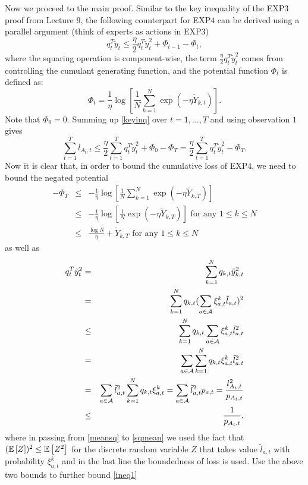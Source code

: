\documentclass[11pt]{article}
\begin{document}
Now we proceed to the main proof. Similar to the key inequality of the EXP$3$ proof from Lecture $9$, the following counterpart for EXP$4$ can be derived using a parallel argument (think of experts as actions in EXP$3$)
\begin{equation}\label{keyinq}
q_t^T\tilde{y}_t\leq \frac{\eta}{2}q_t^T\tilde{y}_t^2+\Phi_{t-1}-\Phi_t,
\end{equation}
where the squaring operation is component-wise, the term $\frac{\eta}{2}q_t^T\tilde{y}_t^2$ comes from controlling the cumulant generating function, and the potential function $\Phi_t$ is defined as:
\begin{equation*}
\Phi_t=\frac{1}{\eta}\log [\frac{1}{N}\sum_{k=1}^N\exp(-\eta\tilde{Y}_{k,t})].
\end{equation*}
Note that $\Phi_0=0$. Summing up \eqref{keyinq} over $t=1,\ldots,T$ and using observation $1$ gives
\begin{equation}\label{ineq1}
\sum_{t=1}^Tl_{A_t,t}\leq \frac{\eta}{2}\sum_{t=1}^Tq_t^T\tilde{y}_t^2+\Phi_0-\Phi_T=\frac{\eta}{2}\sum_{t=1}^Tq_t^T\tilde{y}_t^2-\Phi_T.
\end{equation}
Now it is clear that, in order to bound the cumulative loss of EXP$4$, we need to bound the negated potential
\begin{eqnarray*}
-\Phi_T&\leq&-\frac{1}{\eta}\log [\frac{1}{N}\sum_{k=1}^N\exp(-\eta\tilde{Y}_{k,T})]\\
&\leq&-\frac{1}{\eta}\log [\frac{1}{N}\exp(-\eta\tilde{Y}_{k,T})]\text{ for any }1\leq k\leq N\\
&\leq&\frac{\log N}{\eta}+\tilde{Y}_{k,T}\text{ for any }1\leq k\leq N
\end{eqnarray*}
as well as
\begin{eqnarray}
\nonumber q_t^T\tilde{y}_{t}^2&=&\sum_{k=1}^Nq_{k,t}\tilde{y}_{k,t}^2\\
&=&\sum_{k=1}^Nq_{k,t}(\sum_{a\in \mathcal{A}}\xi_{a,t}^k\tilde{l}_{a,t})^2 \label{meansq} \\
&\leq&\sum_{k=1}^Nq_{k,t}\sum_{a\in \mathcal{A}}\xi_{a,t}^k\tilde{l}_{a,t}^2 \label{sqmean} \\
\nonumber&=&\sum_{a\in \mathcal{A}}\sum_{k=1}^Nq_{k,t}\xi_{a,t}^k\tilde{l}_{a,t}^2\\
\nonumber&=&\sum_{a\in \mathcal{A}}\tilde{l}_{a,t}^2\sum_{k=1}^Nq_{k,t}\xi_{a,t}^k=\sum_{a\in \mathcal{A}}\tilde{l}_{a,t}^2p_{a,t}=\frac{l_{A_t,t}^2}{p_{A_t,t}}\\
\nonumber&\leq&\frac{1}{p_{A_t,t}},
\end{eqnarray}
where in passing from \eqref{meansq} to \eqref{sqmean} we used the fact that $(\mathbb{E}\left[ Z \right])^2 \le \mathbb{E}\left[ Z^2 \right]$ for the discrete random variable $Z$ that takes value $\tilde{l}_{a,t}$ with probability $\xi_{a,t}^k$ and in the last line the boundedness of loss is used. Use the above two bounds to further bound \eqref{ineq1}
\end{document}
